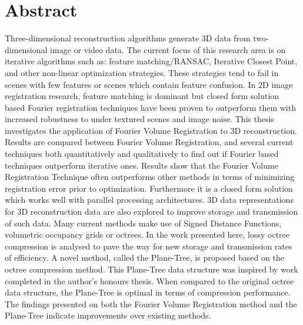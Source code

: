 \makeatletter
\chapter{Abstract}

Three-dimensional reconstruction algorithms generate 3D data from two-dimensional image or video data. The current focus of this research area is on iterative algorithms such as: feature matching/RANSAC, Iterative Closest Point, and other non-linear optimization strategies. These strategies tend to fail in scenes with few features or scenes which contain feature confusion. In 2D image registration research, feature matching is dominant but closed form solution based Fourier registration techniques have been proven to outperform them with increased robustness to under textured scenes and image noise. This thesis investigates the application of Fourier Volume Registration to 3D reconstruction. Results are compared between Fourier Volume Registration, and several current techniques both quantitatively and qualitatively to find out if Fourier based techniques outperform iterative ones. Results show that the Fourier Volume Registration Technique often outperforms other methods in terms of minimizing registration error prior to optimization. Furthermore it is a closed form solution which works well with parallel processing architectures. 3D data representations for 3D reconstruction data are also explored to improve storage and transmission of such data. Many current methods make use of Signed Distance Functions, volumetric occupancy grids or octrees. In the work presented here, lossy octree compression is analysed to pave the way for new storage and transmission rates of efficiency. A novel method, called the Plane-Tree, is proposed based on the octree compression method. This Plane-Tree data structure was inspired by work completed in the author's honours thesis. When compared to the original octree data structure, the Plane-Tree is optimal in terms of compression performance. The findings presented on both the Fourier Volume Registration method and the Plane-Tree indicate improvements over existing methods.


